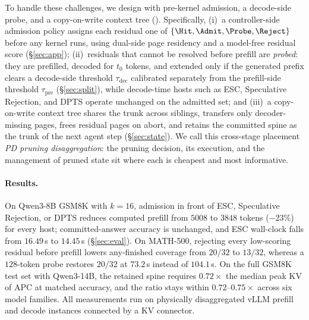 To handle these challenges, we design \sys with pre-kernel admission, a decode-side probe, and a copy-on-write context tree ().
Specifically, (i)~a controller-side admission policy assigns each residual one of $\{\Hit,\Admit,\Probe,\Reject\}$ before any kernel runs, using dual-side page residency and a model-free residual score (\S\ref{sec:app}); (ii)~residuals that cannot be resolved before prefill are \emph{probed}: they are prefilled, decoded for $t_0$ tokens, and extended only if the generated prefix clears a decode-side threshold $\tau_{\mathrm{dec}}$ calibrated separately from the prefill-side threshold $\tau_{\mathrm{pre}}$ (\S\ref{sec:split}), while decode-time hosts such as ESC, Speculative Rejection, and DPTS operate unchanged on the admitted set; and (iii)~a copy-on-write context tree shares the trunk across siblings, transfers only decoder-missing pages, frees residual pages on abort, and retains the committed spine as the trunk of the next agent step (\S\ref{sec:state}).
We call this cross-stage placement \emph{PD pruning disaggregation}: the pruning decision, its execution, and the management of pruned state sit where each is cheapest and most informative.

\paragraph{Results.}
On Qwen3-8B GSM8K with $k{=}16$, admission in front of ESC, Speculative Rejection, or DPTS reduces computed prefill from $5008$ to $3848$ tokens ($-23\%$) for every host; committed-answer accuracy is unchanged, and ESC wall-clock falls from $16.49$\,s to $14.45$\,s (\S\ref{sec:eval}).
On MATH-500, rejecting every low-scoring residual before prefill lowers any-finished coverage from $20/32$ to $13/32$, whereas a $128$-token probe restores $20/32$ at $73.2$\,s instead of $104.1$\,s.
On the full GSM8K test set with Qwen3-14B, the retained spine requires $0.72\times$ the median peak KV of APC at matched accuracy, and the ratio stays within $0.72$--$0.75\times$ across six model families.
All measurements run on physically disaggregated vLLM prefill and decode instances connected by a KV connector.

